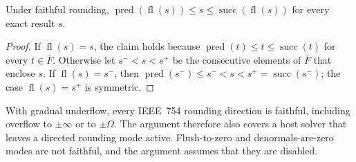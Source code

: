\begin{lemma}\label{lem:enclosure}
Under faithful rounding,
$\operatorname{pred}(\operatorname{fl}(s))\le s\le
\operatorname{succ}(\operatorname{fl}(s))$ for every exact result $s$.
\end{lemma}

\begin{proof}
If $\operatorname{fl}(s)=s$, the claim holds because
$\operatorname{pred}(t)\le t\le\operatorname{succ}(t)$ for every $t\in\bar F$.
Otherwise let $s^-<s<s^+$ be the consecutive elements of $\bar F$ that
enclose $s$. If $\operatorname{fl}(s)=s^-$, then
$\operatorname{pred}(s^-)\le s^-<s<s^+=\operatorname{succ}(s^-)$; the case
$\operatorname{fl}(s)=s^+$ is symmetric.
\end{proof}

With gradual underflow, every IEEE~754 rounding direction is faithful,
including overflow to $\pm\infty$ or to $\pm\Omega$. The argument therefore
also covers a host solver that leaves a directed rounding mode active.
Flush-to-zero and denormals-are-zero modes are not faithful, and the
argument assumes that they are disabled.

